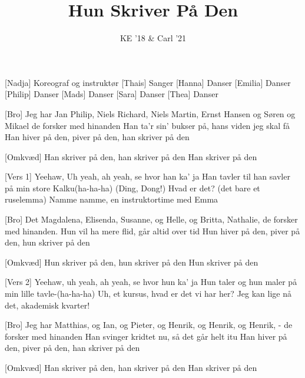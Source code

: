 \documentclass[a4paper,11pt]{article}
\title{Hun Skriver På Den}
\author{KE '18 \& Carl '21}
\begin{document}
\maketitle

\begin{roles}
[Nadja] Koreograf og instruktør
[Thais] Sanger
[Hanna] Danser
[Emilia] Danser
[Philip] Danser
[Mads] Danser
[Sara] Danser
[Thea] Danser
\end{roles}

\begin{song}
[Bro] Jeg har Jan Philip, Niels Richard, Niels Martin, Ernst Hansen
og Søren og Mikael de forsker med hinanden
Han ta'r sin' bukser på, hans viden jeg skal få
Han hiver på den, piver på den, han skriver på den

[Omkvæd] Han skriver på den, han skriver på den 
Han skriver på den

[Vers 1] Yeehaw, Uh yeah, ah yeah, se hvor han ka' ja
Han tavler til han savler på min store Kalku(ha-ha-ha)
(Ding, Dong!) Hvad er det? (det bare et ruselemma)
Namme namme, en instruktortime med Emma

[Bro] Det Magdalena, Elisenda, Susanne, og Helle, og Britta, 
Nathalie, de forsker med hinanden.
Hun vil ha mere flid, går altid over tid
Hun hiver på den, piver på den, hun skriver på den

[Omkvæd] Hun skriver på den, hun skriver på den
Hun skriver på den

[Vers 2] Yeehaw, uh yeah, ah yeah, se hvor hun ka' ja
Hun taler og hun maler på min lille tavle-(ha-ha-ha)
Uh, et kursus, hvad er det vi har her?
Jeg kan lige nå det, akademisk kvarter!

[Bro] Jeg har Matthias, og Ian, og Pieter, og Henrik, og Henrik, 
og Henrik, - de forsker med hinanden
Han svinger kridtet nu, så det går helt itu
Han hiver på den, piver på den, han skriver på den

[Omkvæd] Han skriver på den, han skriver på den
Han skriver på den
\end{song}
\end{document}
